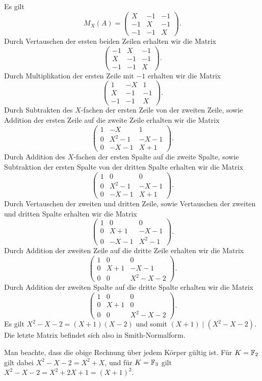 \section{}

Es gilt
\[
    M_X(A)
  = \begin{pmatrix}
       X  & -1  & -1  \\
      -1  &  X  & -1  \\
      -1  & -1  &  X
    \end{pmatrix}.
\]
Durch Vertauschen der ersten beiden Zeilen erhalten wir die Matrix
\[
  \begin{pmatrix}
    -1  &  X  & -1  \\
     X  & -1  & -1  \\
    -1  & -1  &  X
  \end{pmatrix}.
\]
Durch Multiplikation der ersten Zeile mit $-1$ erhalten wir die Matrix
\[
  \begin{pmatrix}
     1  & -X  &  1  \\
     X  & -1  & -1  \\
    -1  & -1  &  X
  \end{pmatrix}.
\]
Durch Subtrakten des $X$-fachen der ersten Zeile von der zweiten Zeile, sowie Addition der ersten Zeile auf die zweite Zeile erhalten wir die Matrix
\[
  \begin{pmatrix}
    1 &    -X   &    1  \\
    0 & X^2  -1 & -X-1  \\
    0 &    -X-1 &  X+1
  \end{pmatrix}.
\]
Durch Addition des $X$-fachen der ersten Spalte auf die zweite Spalte, sowie Subtraktion der ersten Spalte von der dritten Spalte erhalten wir die Matrix
\[
  \begin{pmatrix}
    1 &       0 &    0  \\
    0 & X^2  -1 & -X-1  \\
    0 &    -X-1 &  X+1
  \end{pmatrix}.
\]
Durch Vertauschen der zweiten und dritten Zeile, sowie Vertauschen der zweiten und dritten Spalte erhalten wir die Matrix
\[
  \begin{pmatrix}
    1 &    0  &        0  \\
    0 &  X+1  &     -X-1  \\
    0 & -X-1  &  X^2  -1
  \end{pmatrix}.
\]
Durch Addition der zweiten Zeile auf die dritte Zeile erhalten wir die Matrix
\[
  \begin{pmatrix}
    1 &    0  &        0  \\
    0 &  X+1  &     -X-1  \\
    0 &    0  &  X^2-X-2
  \end{pmatrix}.
\]
Durch Addition der zweiten Spalte auf die dritte Spalte erhalten wir die Matrix
\[
  \begin{pmatrix}
    1 &    0  &        0  \\
    0 &  X+1  &        0  \\
    0 &    0  &  X^2-X-2
  \end{pmatrix}.
\]
Es gilt $X^2 - X - 2 = (X + 1)(X - 2)$ und somit $(X + 1) \mid (X^2 - X - 2)$.
Die letzte Matrix befindet sich also in Smith-Normalform.

Man beachte, dass die obige Rechnung über jedem Körper gültig ist.
Für $K = \mathbb{F}_2$ gilt dabei $X^2 - X - 2 = X^2 + X$, und für $K = \mathbb{F}_3$ gilt $X^2 - X - 2 = X^2 + 2X + 1 = (X+1)^2$.
